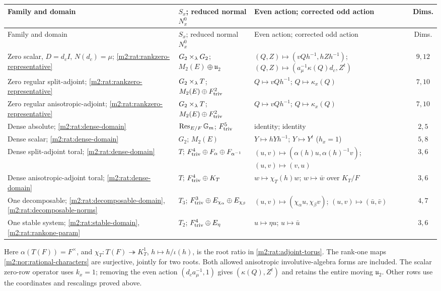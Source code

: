 \begin{theorem}
{\small
\begin{longtable}{@{}L{.20\textwidth}L{.31\textwidth}L{.32\textwidth}c@{}}
\toprule
Family and domain & $S_x$; reduced normal $N_x^0$
 & Even action; corrected odd action & Dims.\\
\midrule
\endfirsthead
\toprule
Family and domain & $S_x$; reduced normal $N_x^0$
 & Even action; corrected odd action & Dims.\\
\midrule
\endhead
\bottomrule
\endfoot
Zero scalar,
$D=d_cI$, $N(d_c)=\mu$;
\eqref{m2:rat:rankzero-representative}
 & $G_2\times_\lambda G_2$;
   $M_2(E)\oplus\mathfrak u_2$
 & $(Q,Z)\mapsto(vQh^{-1},hZh^{-1})$;
   $(Q,Z)\mapsto(a_\mu^{-1}\kappa(Q)d_c,Z^t)$
 & $9,12$\\[5pt]
Zero regular split-adjoint;
\eqref{m2:rat:rankzero-representative}
 & $G_2\times_\lambda T$;
   $M_2(E)\oplus F^2_{\mathrm{triv}}$
 & $Q\mapsto vQh^{-1}$;
   $Q\mapsto\kappa_x(Q)$
 & $7,10$\\[5pt]
Zero regular anisotropic-adjoint;
\eqref{m2:rat:rankzero-representative}
 & $G_2\times_\lambda T$;
   $M_2(E)\oplus F^2_{\mathrm{triv}}$
 & $Q\mapsto vQh^{-1}$;
   $Q\mapsto\kappa_x(Q)$
 & $7,10$\\[5pt]
Dense absolute;
\eqref{m2:rat:dense-domain}
 & $\operatorname{Res}_{E/F}\mathbb G_m$;
   $F^5_{\mathrm{triv}}$
 & identity; identity
 & $2,5$\\[5pt]
Dense scalar;
\eqref{m2:rat:dense-domain}
 & $G_2$;
   $M_2(E)$
 & $Y\mapsto hYh^{-1}$;
   $Y\mapsto Y^t$ ($h_x=1$)
 & $5,8$\\[5pt]
Dense split-adjoint toral;
\eqref{m2:rat:dense-domain}
 & $T$;
   $F^4_{\mathrm{triv}}\oplus F_\alpha\oplus F_{\alpha^{-1}}$
 & $(u,v)\mapsto(\alpha(h)u,\alpha(h)^{-1}v)$;
   $(u,v)\mapsto(v,u)$
 & $3,6$\\[5pt]
Dense anisotropic-adjoint toral;
\eqref{m2:rat:dense-domain}
 & $T$;
   $F^4_{\mathrm{triv}}\oplus K_T$
 & $w\mapsto\chi_T(h)w$;
   $w\mapsto\bar w$ over $K_T/F$
 & $3,6$\\[5pt]
One decomposable;
\eqref{m2:rat:decomposable-domain},
\eqref{m2:rat:decomposable-norms}
 & $T_3$;
   $F^3_{\mathrm{triv}}\oplus E_{\chi_\alpha}\oplus E_{\chi_\beta}$
 & $(u,v)\mapsto(\chi_\alpha u,\chi_\beta v)$;
   $(u,v)\mapsto(\bar u,\bar v)$
 & $4,7$\\[5pt]
One stable system;
\eqref{m2:rat:stable-domain},
\cref{m2:rat:rankone-param}
 & $T_2$;
   $F^4_{\mathrm{triv}}\oplus E_\eta$
 & $u\mapsto\eta u$;
   $u\mapsto\bar u$
 & $3,6$
\end{longtable}}

Here $\alpha(T(F))=F^\times$, and
$\chi_T:T(F)\twoheadrightarrow K_T^1$, $h\mapsto h/\iota(h)$,
is the root ratio in \cref{m2:rat:adjoint-torus}. The rank-one maps
\eqref{m2:nor:rational-characters} are surjective, jointly for two
roots. Both allowed anisotropic involutive-algebra forms are included.
The scalar zero-row operator uses $k_x=1$; removing the even action
$(d_ca_\mu^{-1},1)$ gives $(\kappa(Q),Z^t)$ and retains the entire
moving $\mathfrak u_2$. Other rows use the coordinates and rescalings
proved above.


\end{theorem}
